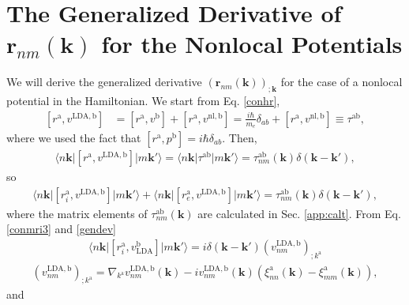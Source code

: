 \section{The Generalized Derivative of
\texorpdfstring{$\mathbf{r}_{nm}(\mathbf{k})$} {{rnm};k} for
the Nonlocal Potentials}\label{app:gdernl}

We will derive the generalized derivative
$(\mathbf{r}_{nm}(\mathbf{k}))_{;\mathbf{k}}$ for the case of a nonlocal
potential in the Hamiltonian. We start from Eq. \eqref{conhr},
\begin{align}\label{na_hrdab}
[r^{\mathrm{a}},v^{\mathrm{LDA},\mathrm{b}}]
&= [r^{\mathrm{a}},v^\mathrm{b}] + [r^{\mathrm{a}},v^{\mathrm{nl},\mathrm{b}}]
= \frac{i\hbar}{m_e}\delta_{ab}+ [r^{\mathrm{a}},v^{\mathrm{nl},\mathrm{b}}]
\equiv  
\tau^{\mathrm{a}\mathrm{b}},
\end{align}  
where we used the fact that $[r^\mathrm{a},p^\mathrm{b}]=i\hbar\delta_{ab}$.
Then,
\begin{align}\label{na_hrdab2}
\langle n\mathbf{k}\vert[r^{\mathrm{a}},v^{\mathrm{LDA},\mathrm{b}}]\vert m\mathbf{k}'\rangle
=
\langle n\mathbf{k}\vert\tau^{\mathrm{a}\mathrm{b}}\vert m\mathbf{k}'\rangle
=
\tau^{\mathrm{a}\mathrm{b}}_{nm}(\mathbf{k})\delta(\mathbf{k}-\mathbf{k}')
,
\end{align}
so
\begin{align}\label{na_hrdab3}
\langle n\mathbf{k}\vert[r^{\mathrm{a}}_i,v^{\mathrm{LDA},\mathrm{b}}]\vert m\mathbf{k}'\rangle
+
\langle n\mathbf{k}\vert[r^{\mathrm{a}}_e,v^{\mathrm{LDA},\mathrm{b}}]\vert m\mathbf{k}'\rangle
=
\tau^{\mathrm{a}\mathrm{b}}_{nm}(\mathbf{k})\delta(\mathbf{k}-\mathbf{k}')
,
\end{align}
where the matrix elements of $\tau^{\mathrm{a}\mathrm{b}}_{nm}(\mathbf{k})$ are calculated in  
Sec. \ref{app:calt}.  
From Eq. \eqref{conmri3} and  \eqref{gendev}
\begin{align}\label{na_rip}
\langle n\mathbf{k}\vert[r^{\mathrm{a}}_i,v_\mathrm{LDA}^{\mathrm{b}}]\vert m\mathbf{k}'\rangle
=i\delta(\mathbf{k}-\mathbf{k}')(v_{nm}^{\mathrm{LDA},\mathrm{b}})_{;k^{\mathrm{a}}}
\end{align}
\begin{align}\label{na_ripn}
(v^{\mathrm{LDA},\mathrm{b}}_{nm})_{;k^{\mathrm{a}}}=
\nabla_{k^{\mathrm{a}}}
v^{\mathrm{LDA},\mathrm{b}}_{n m}(\mathbf{k})
-
i
v^{\mathrm{LDA},\mathrm{b}}_{nm}(\mathbf{k})
\left(
\xi^{\mathrm{a}}_{nn}(\mathbf{k})
-
\xi^{\mathrm{a}}_{mm}(\mathbf{k})
\right)
,
\end{align}
and
